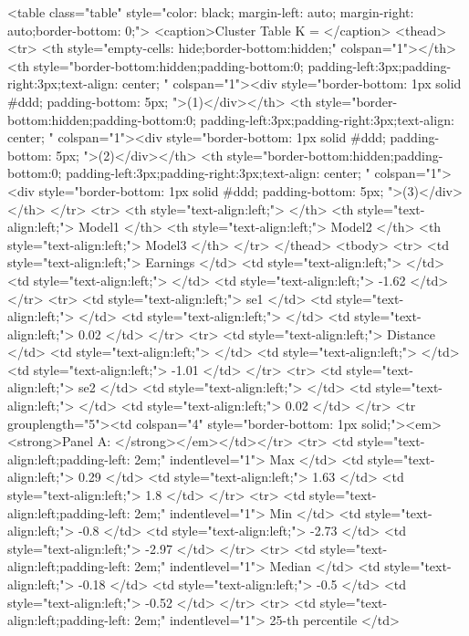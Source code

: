 <table class="table" style="color: black; margin-left: auto; margin-right: auto;border-bottom: 0;">
<caption>Cluster Table K = </caption>
 <thead>
<tr>
<th style="empty-cells: hide;border-bottom:hidden;" colspan="1"></th>
<th style="border-bottom:hidden;padding-bottom:0; padding-left:3px;padding-right:3px;text-align: center; " colspan="1"><div style="border-bottom: 1px solid #ddd; padding-bottom: 5px; ">(1)</div></th>
<th style="border-bottom:hidden;padding-bottom:0; padding-left:3px;padding-right:3px;text-align: center; " colspan="1"><div style="border-bottom: 1px solid #ddd; padding-bottom: 5px; ">(2)</div></th>
<th style="border-bottom:hidden;padding-bottom:0; padding-left:3px;padding-right:3px;text-align: center; " colspan="1"><div style="border-bottom: 1px solid #ddd; padding-bottom: 5px; ">(3)</div></th>
</tr>
  <tr>
   <th style="text-align:left;">  </th>
   <th style="text-align:left;"> Model1 </th>
   <th style="text-align:left;"> Model2 </th>
   <th style="text-align:left;"> Model3 </th>
  </tr>
 </thead>
<tbody>
  <tr>
   <td style="text-align:left;"> Earnings </td>
   <td style="text-align:left;">  </td>
   <td style="text-align:left;">  </td>
   <td style="text-align:left;"> -1.62 </td>
  </tr>
  <tr>
   <td style="text-align:left;"> se1 </td>
   <td style="text-align:left;">  </td>
   <td style="text-align:left;">  </td>
   <td style="text-align:left;"> 0.02 </td>
  </tr>
  <tr>
   <td style="text-align:left;"> Distance </td>
   <td style="text-align:left;">  </td>
   <td style="text-align:left;">  </td>
   <td style="text-align:left;"> -1.01 </td>
  </tr>
  <tr>
   <td style="text-align:left;"> se2 </td>
   <td style="text-align:left;">  </td>
   <td style="text-align:left;">  </td>
   <td style="text-align:left;"> 0.02 </td>
  </tr>
  <tr grouplength="5"><td colspan="4" style="border-bottom: 1px solid;"><em><strong>Panel A: </strong></em></td></tr>
<tr>
   <td style="text-align:left;padding-left: 2em;" indentlevel="1"> Max </td>
   <td style="text-align:left;"> 0.29 </td>
   <td style="text-align:left;"> 1.63 </td>
   <td style="text-align:left;"> 1.8 </td>
  </tr>
  <tr>
   <td style="text-align:left;padding-left: 2em;" indentlevel="1"> Min </td>
   <td style="text-align:left;"> -0.8 </td>
   <td style="text-align:left;"> -2.73 </td>
   <td style="text-align:left;"> -2.97 </td>
  </tr>
  <tr>
   <td style="text-align:left;padding-left: 2em;" indentlevel="1"> Median </td>
   <td style="text-align:left;"> -0.18 </td>
   <td style="text-align:left;"> -0.5 </td>
   <td style="text-align:left;"> -0.52 </td>
  </tr>
  <tr>
   <td style="text-align:left;padding-left: 2em;" indentlevel="1"> 25-th percentile </td>
